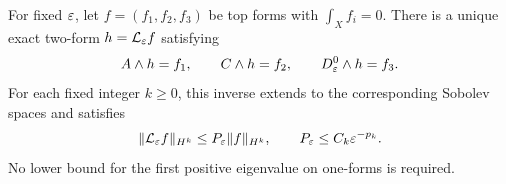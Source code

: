 \begin{lemma}
\label{lem:auxiliary-inverse}
For fixed $\varepsilon$, let $f=(f_1,f_2,f_3)$ be top forms with
$\int_X f_i=0$.  There is a unique exact two-form
$h=\mathcal L_\varepsilon f$ satisfying
\begin{equation}
  A\wedge h=f_1,\qquad C\wedge h=f_2,\qquad
  D^0_\varepsilon\wedge h=f_3.
  \label{eq:auxiliary-linear-system}
\end{equation}
For each fixed integer $k\ge0$, this inverse extends to the corresponding
Sobolev spaces and satisfies
\begin{equation}
  \|\mathcal L_\varepsilon f\|_{H^k}
     \le P_\varepsilon\|f\|_{H^k},
  \qquad P_\varepsilon\le C_k\varepsilon^{-p_k}.
  \label{eq:auxiliary-inverse-bound}
\end{equation}
No lower bound for the first positive eigenvalue on one-forms is
required.
\end{lemma}

